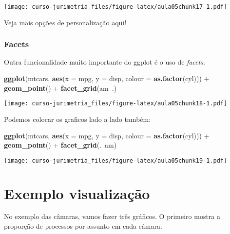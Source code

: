 \documentclass[]{book}
\newenvironment{Shaded}{\begin{snugshade}}{\end{snugshade}}
\newcommand{\KeywordTok}[1]{\textcolor[rgb]{0.13,0.29,0.53}{\textbf{{#1}}}}
\newcommand{\DataTypeTok}[1]{\textcolor[rgb]{0.13,0.29,0.53}{{#1}}}
\newcommand{\StringTok}[1]{\textcolor[rgb]{0.31,0.60,0.02}{{#1}}}
\newcommand{\NormalTok}[1]{{#1}}
\begin{document}
\texttt{[image: curso-jurimetria\_files/figure-latex/aula05chunk17-1.pdf]}

Veja mais opções de personalização
\href{http://www.cookbook-r.com/Graphs/Legends_(ggplot2)/}{aqui!}

\subsubsection{Facets}\label{facets}

Outra funcionalidade muito importante do ggplot é o uso de
\emph{facets}.

\begin{Shaded}
\begin{Highlighting}[]
\KeywordTok{ggplot}\NormalTok{(mtcars, }\KeywordTok{aes}\NormalTok{(}\DataTypeTok{x =} \NormalTok{mpg, }\DataTypeTok{y =} \NormalTok{disp, }\DataTypeTok{colour =} \KeywordTok{as.factor}\NormalTok{(cyl))) +}\StringTok{ }
\StringTok{  }\KeywordTok{geom_point}\NormalTok{() +}\StringTok{ }
\StringTok{  }\KeywordTok{facet_grid}\NormalTok{(am~.)}
\end{Highlighting}
\end{Shaded}

\texttt{[image: curso-jurimetria\_files/figure-latex/aula05chunk18-1.pdf]}

Podemos colocar os graficos lado a lado também:

\begin{Shaded}
\begin{Highlighting}[]
\KeywordTok{ggplot}\NormalTok{(mtcars, }\KeywordTok{aes}\NormalTok{(}\DataTypeTok{x =} \NormalTok{mpg, }\DataTypeTok{y =} \NormalTok{disp, }\DataTypeTok{colour =} \KeywordTok{as.factor}\NormalTok{(cyl))) +}
\StringTok{  }\KeywordTok{geom_point}\NormalTok{() +}\StringTok{ }
\StringTok{  }\KeywordTok{facet_grid}\NormalTok{(.~am)}
\end{Highlighting}
\end{Shaded}

\texttt{[image: curso-jurimetria\_files/figure-latex/aula05chunk19-1.pdf]}

\section{Exemplo visualização}\label{exemplo-visualizacao}

No exemplo das câmaras, vamos fazer três gráficos. O primeiro mostra a
proporção de processos por assunto em cada câmara.
\end{document}

